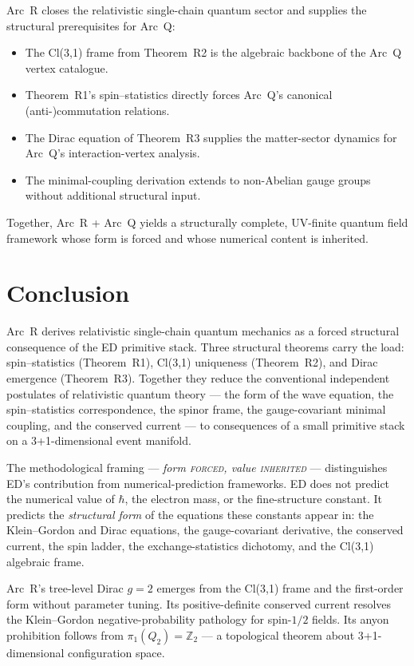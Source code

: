 \documentclass[11pt,a4paper]{article}
\begin{document}
Arc~R closes the relativistic single-chain quantum sector and supplies the structural prerequisites for Arc~Q:
\begin{itemize}
  \item The Cl(3,1) frame from Theorem~R2 is the algebraic backbone of the Arc~Q vertex catalogue.
  \item Theorem~R1's spin--statistics directly forces Arc~Q's canonical (anti-)commutation relations.
  \item The Dirac equation of Theorem~R3 supplies the matter-sector dynamics for Arc~Q's interaction-vertex analysis.
  \item The minimal-coupling derivation extends to non-Abelian gauge groups without additional structural input.
\end{itemize}
Together, Arc~R + Arc~Q yields a structurally complete, UV-finite quantum field framework whose form is forced and whose numerical content is inherited.

\section{Conclusion}

Arc~R derives relativistic single-chain quantum mechanics as a forced structural consequence of the ED primitive stack. Three structural theorems carry the load: spin--statistics (Theorem~R1), Cl(3,1) uniqueness (Theorem~R2), and Dirac emergence (Theorem~R3). Together they reduce the conventional independent postulates of relativistic quantum theory --- the form of the wave equation, the spin--statistics correspondence, the spinor frame, the gauge-covariant minimal coupling, and the conserved current --- to consequences of a small primitive stack on a 3+1-dimensional event manifold.

The methodological framing --- \emph{form \textsc{forced}, value \textsc{inherited}} --- distinguishes ED's contribution from numerical-prediction frameworks. ED does not predict the numerical value of $\hbar$, the electron mass, or the fine-structure constant. It predicts the \emph{structural form} of the equations these constants appear in: the Klein--Gordon and Dirac equations, the gauge-covariant derivative, the conserved current, the spin ladder, the exchange-statistics dichotomy, and the Cl(3,1) algebraic frame.

Arc~R's tree-level Dirac $g = 2$ emerges from the Cl(3,1) frame and the first-order form without parameter tuning. Its positive-definite conserved current resolves the Klein--Gordon negative-probability pathology for spin-$1/2$ fields. Its anyon prohibition follows from $\pi_1(Q_2) = \mathbb{Z}_2$ --- a topological theorem about 3+1-dimensional configuration space.
\end{document}
